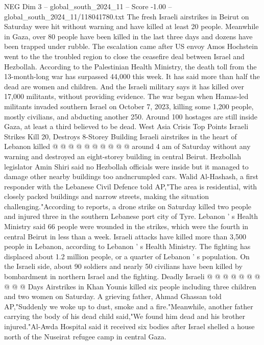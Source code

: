 \begin{textsample}{NEG Dim 3 – global\_south\_2024\_11 – Score -1.00 – global\_south\_2024\_11/118041780.txt}  \label{ex:f3_neg_153}
The fresh Israeli airstrikes in Beirut on Saturday were hit without warning and have killed at least 20 people.
Meanwhile in Gaza, over 80 people have been killed in the last three days and dozens have been trapped under rubble.
The escalation came after US envoy Amos Hochstein went to the the troubled region to close the ceasefire deal between Israel and Hezbollah.
According to the Palestinian Health Ministry, the death toll from the 13-month-long war has surpassed 44,000 this week.
It has said more than half the dead are women and children.
And the Israeli military says it has killed over 17,000 militants, without providing evidence.
The war began when Hamas-led militants invaded southern Israel on October 7, 2023, killing some 1,200 people, mostly civilians, and abducting another 250.
Around 100 hostages are still inside Gaza, at least a third believed to be dead.
West Asia Crisis Top Points Israeli Strikes Kill 20, Destroys 8-Storey Building Israeli airstrikes in the heart of Lebanon killed @ @ @ @ @ @ @ @ @ @ around 4 am of Saturday without any warning and destroyed an eight-storey building in central Beirut.
Hezbollah legislator Amin Shiri said no Hezbollah officials were inside but it managed to damage other nearby buildings too andncrumpled cars.
Walid Al-Hashash, a first responder with the Lebanese Civil Defence told AP,"The area is residential, with closely packed buildings and narrow streets, making the situation challenging."According to reports, a drone strike on Saturday killed two people and injured three in the southern Lebanese port city of Tyre.
Lebanon ' s Health Ministry said 66 people were wounded in the strikes, which were the fourth in central Beirut in less than a week.
Israeli attacks have killed more than 3,500 people in Lebanon, according to Lebanon ' s Health Ministry.
The fighting has displaced about 1.2 million people, or a quarter of Lebanon ' s population.
On the Israeli side, about 90 soldiers and nearly 50 civilians have been killed by bombardment in northern Israel and the fighting.
Deadly Israeli @ @ @ @ @ @ @ @ @ @ Days Airstrikes in Khan Younis killed six people including three children and two women on Saturday.
A grieving father, Ahmad Ghassan told AP,"Suddenly we woke up to dust, smoke and a fire."Meanwhile, another father carrying the body of his dead child said,"We found him dead and his brother injured."Al-Awda Hospital said it received six bodies after Israel shelled a house north of the Nuseirat refugee camp in central Gaza.

\end{textsample}
